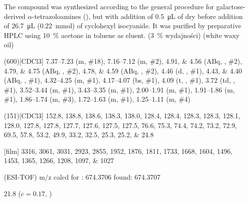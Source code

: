 The compound was synthesized according to the general procedure for galactose-derived $\alpha$-tetrazoloamines (),
but with addition of \SI{0.5}{\micro\liter} of dry  before addition of \SI{26.7}{\micro\liter} (\SI{0.22}{\milli\mol}) of cyclohexyl isocyanide.
It was purified by preparative HPLC using \SI{10}{\percent}  acetone in toluene as eluent.
(\SI{3}{\percent} wydajności) (white waxy oil)
\begin{fullexp}
	\NMR(600)[CDCl3] \numrange{7.37}{7.23} (m, \#{18}), \numrange{7.16}{7.12} (m, \#{2}), \numlist{4.91;4.56} (ABq, , \#{2}), \numlist{4.79;4.75} (ABq, , \#{2}), \numlist{4.78;4.59} (ABq, , \#{2}), \num{4.46} (d, , \#{1}), \numlist{4.43;4.40} (ABq, , \#{1}), \numrange{4.32}{4.25} (m, \#{1}), \numrange{4.17}{4.07} (bs, \#{1}), \num{4.09} (t, , \#{1}), \num{3.72} (td, , \#{1}), \numrange{3.52}{3.44} (m, \#{1}), \numrange{3.43}{3.35} (m, \#{1}), \numrange{2.00}{1.91} (m, \#{1}), \numrange{1.91}{1.86} (m, \#{1}), \numrange{1.86}{1.74} (m, \#{3}), \numrange{1.72}{1.63} (m, \#{1}), \numrange{1.25}{1.11} (m, \#{4})\par\noindent
	(151)[CDCl3] \numlist{152.8; 138.8; 138.6; 138.3; 138.0; 128.4; 128.4; 128.3; 128.3; 128.1; 128.0; 127.8; 127.8; 127.7; 127.6; 127.5; 127.5; 76.6; 75.3; 74.4; 74.2; 73.2; 72.9; 69.5; 57.8; 53.2; 49.9; 33.2; 32.5; 25.3; 25.2; 24.8}\par\noindent
	[film] \numlist{3316; 3061; 3031; 2923; 2855; 1952; 1876; 1811; 1733; 1668; 1604; 1496; 1453; 1365; 1266; 1208; 1097; 1027}\par\noindent
	 (ESI-TOF) m/z calcd for : \num{674.3706} found: \num{674.3707}\par\noindent
	\data{[$\alpha^{23}_D$]~$=$} \num{21.8} ($c = 0.17$, )
\end{fullexp}

